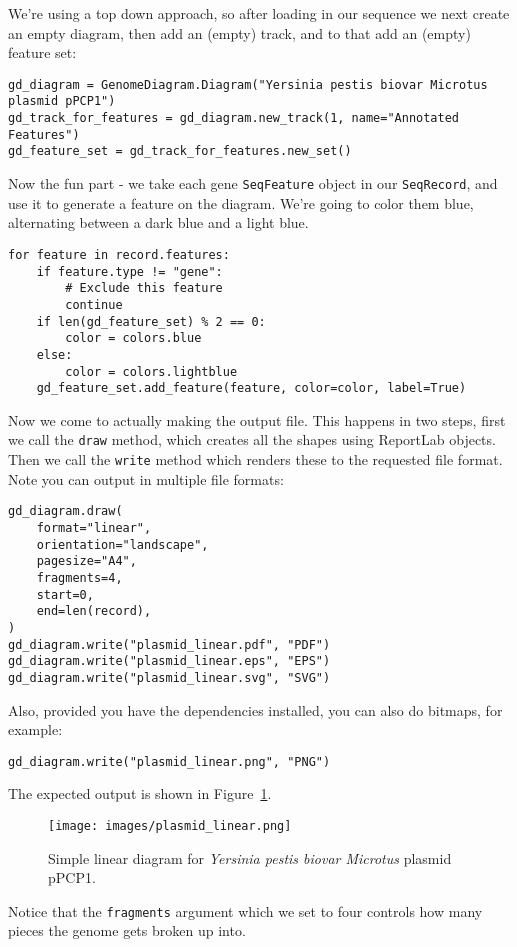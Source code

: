 We're using a top down approach, so after loading in our sequence we next
create an empty diagram, then add an (empty) track, and to that add an
(empty) feature set:

\begin{verbatim}
gd_diagram = GenomeDiagram.Diagram("Yersinia pestis biovar Microtus plasmid pPCP1")
gd_track_for_features = gd_diagram.new_track(1, name="Annotated Features")
gd_feature_set = gd_track_for_features.new_set()
\end{verbatim}

Now the fun part - we take each gene \verb|SeqFeature| object in our
\verb|SeqRecord|, and use it to generate a feature on the diagram. We're
going to color them blue, alternating between a dark blue and a light blue.
\begin{verbatim}
for feature in record.features:
    if feature.type != "gene":
        # Exclude this feature
        continue
    if len(gd_feature_set) % 2 == 0:
        color = colors.blue
    else:
        color = colors.lightblue
    gd_feature_set.add_feature(feature, color=color, label=True)
\end{verbatim}

Now we come to actually making the output file.  This happens in two steps,
first we call the \verb|draw| method, which creates all the shapes using
ReportLab objects.  Then we call the \verb|write| method which renders these
to the requested file format.  Note you can output in multiple file formats:

\begin{verbatim}
gd_diagram.draw(
    format="linear",
    orientation="landscape",
    pagesize="A4",
    fragments=4,
    start=0,
    end=len(record),
)
gd_diagram.write("plasmid_linear.pdf", "PDF")
gd_diagram.write("plasmid_linear.eps", "EPS")
gd_diagram.write("plasmid_linear.svg", "SVG")
\end{verbatim}

Also, provided you have the dependencies installed, you can also do bitmaps,
for example:

\begin{verbatim}
gd_diagram.write("plasmid_linear.png", "PNG")
\end{verbatim}

The expected output is shown in Figure~\ref{fig:plasmid_linear}.
\begin{figure}[htbp]
\centering
\texttt{[image: images/plasmid\_linear.png]}
\caption{Simple linear diagram for \textit{Yersinia pestis biovar Microtus} plasmid pPCP1.}
\label{fig:plasmid_linear}
\end{figure}
Notice that the \verb|fragments| argument which we set to four controls how
many pieces the genome gets broken up into.

